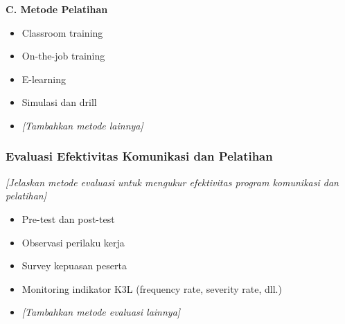\vspace{0.3cm}

\textbf{C. Metode Pelatihan}

\begin{itemize}
    \item Classroom training
    \item On-the-job training
    \item E-learning
    \item Simulasi dan drill
    \item \textit{[Tambahkan metode lainnya]}
\end{itemize}

\vspace{0.5cm}

\subsubsection{Evaluasi Efektivitas Komunikasi dan Pelatihan}

\textit{[Jelaskan metode evaluasi untuk mengukur efektivitas program komunikasi dan pelatihan]}

\begin{itemize}
    \item Pre-test dan post-test
    \item Observasi perilaku kerja
    \item Survey kepuasan peserta
    \item Monitoring indikator K3L (frequency rate, severity rate, dll.)
    \item \textit{[Tambahkan metode evaluasi lainnya]}
\end{itemize}

